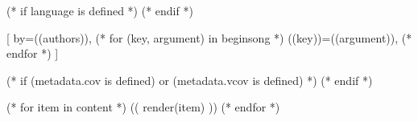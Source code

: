 
(* if language is defined *)
(* endif *)

[
  by={((authors))},
  (* for (key, argument) in beginsong *)
    ((key))={((argument))},
  (* endfor *)
  ]

  (* if (metadata.cov is defined) or (metadata.vcov is defined) *)
  \cover
  (* endif *)

  (* for item in content *)
        (( render(item) ))
  (* endfor *)

\endsong

